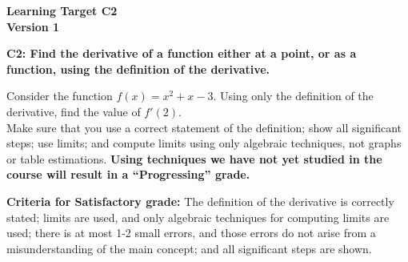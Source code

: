 \documentclass[10pt]{article}
\begin{document}
	\vspace*{0in}

		\begin{center}
			\textbf{Learning Target C2 \\
			Version 1} \\
		\end{center}


\begin{framed}
	\textbf{C2: Find the derivative of a function either at a point, or as a function, using the definition of the derivative.
}
\end{framed}

Consider the function $f(x) = x^2 + x - 3$. Using only the definition of the derivative, find the value of $f'(2)$. \\

Make sure that you use a correct statement of the definition; show all significant steps; use limits; and compute limits using only algebraic techniques, not graphs or table estimations. \textbf{Using techniques we have not yet studied in the course will result in a ``Progressing'' grade.} 


\vfill


\begin{small}
    \begin{framed}
        	\textbf{Criteria for Satisfactory grade:} The definition of the derivative is correctly stated; limits are used, and only algebraic techniques for computing limits are used; there is at most 1-2 small errors, and those errors do not arise from a misunderstanding of the main concept; and all significant steps are shown. 
    \end{framed}

\end{small}
\end{document}
